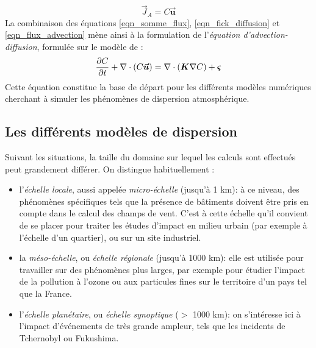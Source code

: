 	\begin{equation}
	\label{eqn_flux_advection}
	\vec{J}_A = C\bm{\vec{u}}
	\end{equation}
	La combinaison des équations \eqref{eqn_somme_flux}, \eqref{eqn_fick_diffusion} et \eqref{eqn_flux_advection} mène ainsi à la formulation de l'\textit{équation d'advection-diffusion}, formulée sur le modèle de \cite{Stockie2011}:\\
	
	\begin{equation}
		\label{eqn_advection_diffusion}
		\dfrac{\partial C}{\partial t} + \nabla \cdot(C\bm{\vec{u}}) = \nabla \cdot (\bm{K}\nabla C) + {\bm{\varsigma}}
	\end{equation}
	Cette équation constitue la base de départ pour les différents modèles numériques cherchant à simuler les phénomènes de dispersion atmosphérique.\\
	
	\subsection{Les différents modèles de dispersion}
	
	Suivant les situations, la taille du domaine sur lequel les calculs sont effectués peut grandement différer. On distingue habituellement : \\
	\begin{itemize}
		\item l'\textit{échelle locale}, aussi appelée \textit{micro-échelle} (jusqu'à 1 km): à ce niveau, des phénomènes spécifiques tels que la présence de bâtiments doivent être pris en compte dans le calcul des champs de vent. C'est à cette échelle qu'il convient de se placer pour traiter les études d'impact en milieu urbain (par exemple à l'échelle d'un quartier), ou sur un site industriel. 
		\item la \textit{méso-échelle}, ou \textit{échelle régionale} (jusqu'à 1000 km): elle est utilisée pour travailler sur des phénomènes plus larges, par exemple pour étudier l'impact de la pollution à l'ozone ou aux particules fines sur le territoire d'un pays tel que la France. 
		\item l'\textit{échelle planétaire}, ou \textit{échelle synoptique} ($>$ 1000 km): on s'intéresse ici à l'impact d'événements de très grande ampleur, tels que les incidents de Tchernobyl ou Fukushima. \\
		
	\end{itemize}
	
